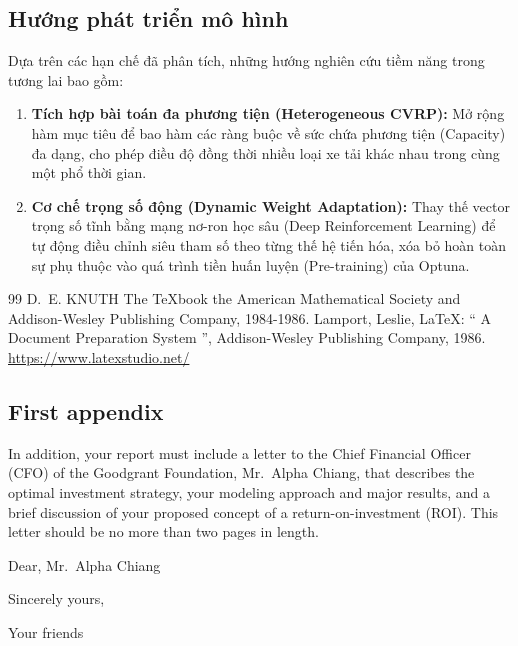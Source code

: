 \documentclass[twoside,12pt]{article}
\begin{document}
\subsection{Hướng phát triển mô hình}
Dựa trên các hạn chế đã phân tích, những hướng nghiên cứu tiềm năng trong tương lai bao gồm:

\begin{enumerate}
    \item \textbf{Tích hợp bài toán đa phương tiện (Heterogeneous CVRP):} Mở rộng hàm mục tiêu để bao hàm các ràng buộc về sức chứa phương tiện (Capacity) đa dạng, cho phép điều độ đồng thời nhiều loại xe tải khác nhau trong cùng một phổ thời gian.

    \item \textbf{Cơ chế trọng số động (Dynamic Weight Adaptation):} Thay thế vector trọng số tĩnh bằng mạng nơ-ron học sâu (Deep Reinforcement Learning) để tự động điều chỉnh siêu tham số theo từng thế hệ tiến hóa, xóa bỏ hoàn toàn sự phụ thuộc vào quá trình tiền huấn luyện (Pre-training) của Optuna.
\end{enumerate}

\newpage
\thispagestyle{empty}
\begin{thebibliography}{99}
 D.~E. KNUTH   The \TeX{}book  the American
Mathematical Society and Addison-Wesley
Publishing Company, 1984-1986.
Lamport, Leslie,  \LaTeX{}: `` A Document Preparation System '',
Addison-Wesley Publishing Company, 1986.
\url{https://www.latexstudio.net/}
\end{thebibliography}
\newpage

\begin{appendices}
    \section{First appendix}

In addition, your report must include a letter to the Chief Financial Officer (CFO) of the Goodgrant Foundation, Mr.~Alpha Chiang, that describes the optimal investment strategy, your modeling approach and major results, and a brief discussion of your proposed concept of a return-on-investment (ROI). This letter should be no more than two pages in length.

Dear, Mr.~Alpha Chiang

\lipsum[1-2]

\vspace{\parskip}

Sincerely yours,

Your friends
\end{appendices}
\end{document}
